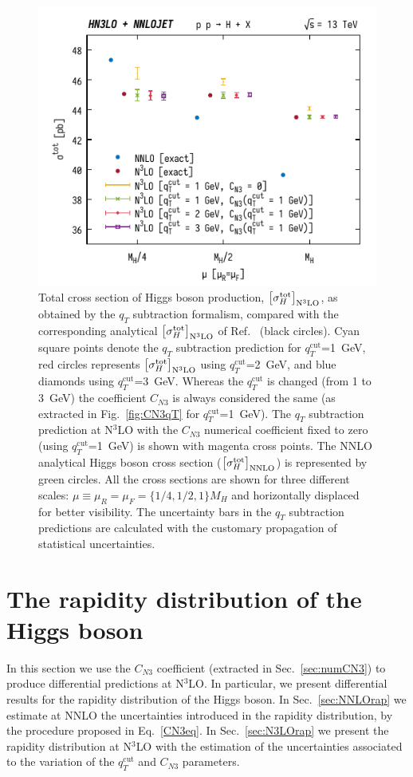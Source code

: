 \documentclass[12pt]{article}
\DeclareRobustCommand{\qt}{q_T}
\DeclareRobustCommand{\qtcut}{\ensuremath{q_T^\mathrm{cut}}}
\begin{document}
\begin{figure}[t]
\centering
\includegraphics[width=.6\linewidth]{./new_figures/totXsecN3LO}
\caption{\label{fig:totXsecN3LO}{Total cross section of Higgs boson production, $\bigl[\sigma_{H}^{{\rm {tot}}}\bigr]_{\rm N^{3}LO}$, as obtained by the $\qt$ subtraction formalism, compared with the corresponding analytical $\bigl[\sigma_{H}^{{\rm {tot}}}\bigr]_{\rm N^{3}LO}$ of Ref.~\cite{Mistlberger:2018etf} (black circles).  Cyan square points denote the $\qt$ subtraction prediction for $\qtcut$=1~GeV, red circles represents  $\bigl[\sigma_{H}^{{\rm {tot}}}\bigr]_{\rm N^{3}LO}$ using $\qtcut$=2~GeV, and blue diamonds using $\qtcut$=3~GeV. Whereas the $\qtcut$ is changed (from 1 to 3~GeV) the coefficient $C_{N3}$ is always considered the same (as extracted in Fig.~\ref{fig:CN3qT} for $\qtcut$=1~GeV). The $\qt$ subtraction prediction at N$^{3}$LO with the $C_{N3}$ numerical coefficient fixed to zero (using $\qtcut$=1~GeV) is shown with magenta cross points. The NNLO analytical Higgs boson cross section ($\bigl[\sigma_{H}^{{\rm {tot}}}\bigr]_{\rm NNLO}$) is represented by green circles. All the cross sections are shown for three different scales: $\mu \equiv \mu_R = \mu_F = \{1/4,1/2,1 \} M_H$ and horizontally displaced for better visibility. The uncertainty bars in the $\qt$ subtraction predictions are calculated with the customary propagation of statistical uncertainties.}}
\end{figure}



\section{The rapidity distribution of the Higgs boson}
\label{sec:rapgen}
In this section we use the $C_{N3}$ coefficient (extracted in Sec.~\ref{sec:numCN3}) to produce differential predictions at N$^{3}$LO. In particular, we present differential results for the rapidity distribution of the Higgs boson. In Sec.~\ref{sec:NNLOrap}  we estimate at NNLO the uncertainties introduced in the rapidity distribution, by the procedure proposed in Eq.~\eqref{CN3eq}. In Sec.~\ref{sec:N3LOrap} we present the rapidity distribution at N$^{3}$LO with the
 estimation of the uncertainties associated to the variation of the $\qtcut$ and $C_{N3}$ parameters.
\end{document}
